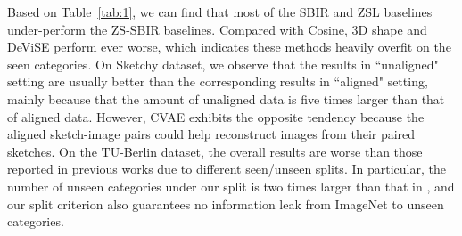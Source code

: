 \documentclass[10pt,twocolumn,letterpaper]{article}
\begin{document}

\begin{table}[]
\caption{Ablation Studies of our method on Sketchy dataset.}
\label{tab:2}
\vspace{-10pt}
\end{table}


Based on Table~\ref{tab:1}, we can find that most of the SBIR and ZSL baselines under-perform the ZS-SBIR baselines. 
Compared with Cosine, 3D shape \cite{wang2015sketch} and DeViSE \cite{frome2013devise} perform ever worse, which indicates these methods heavily overfit on the seen categories. 
On Sketchy dataset, we observe that the results in ``unaligned" setting are usually better than the corresponding results in ``aligned" setting, mainly because that the amount of unaligned data is five times larger than that of aligned data.
However, CVAE exhibits the opposite tendency because the aligned sketch-image pairs could help reconstruct images from their paired sketches. 
On the TU-Berlin dataset, the overall results are worse than those reported in previous works \cite{liu2019semantic, dutta2019semantically} due to different seen/unseen splits. 
In particular, the number of unseen categories under our split is two times larger than that in  \cite{liu2019semantic, dutta2019semantically}, and our split criterion also guarantees no information leak from ImageNet to unseen categories.
\end{document}
